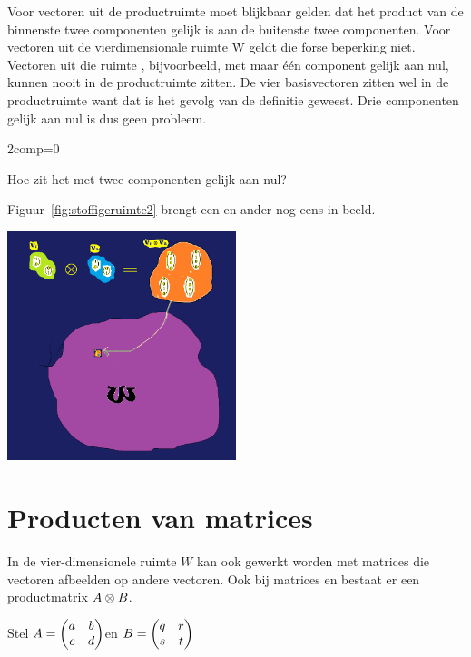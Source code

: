 \documentclass[../main.tex]{subfiles}
\begin{document}
\begin{mdframed}[style=wiskader,frametitle={Matrixen}]
Voor vectoren uit de productruimte moet blijkbaar gelden dat het product van de binnenste twee componenten gelijk is aan de buitenste twee componenten. Voor vectoren uit de vierdimensionale ruimte W geldt die forse beperking niet. Vectoren uit die ruimte , bijvoorbeeld, met maar \'e\'en component gelijk aan nul, kunnen nooit in de productruimte zitten. De vier basisvectoren zitten wel in de productruimte want dat is het gevolg van de definitie geweest. Drie componenten gelijk aan nul is dus geen probleem.

\begin{antwoord}
2comp=0
\end{antwoord}
\begin{opdracht}
Hoe zit het met twee componenten gelijk aan nul?
\end{opdracht}
 
Figuur~\ref{fig:stoffigeruimte2} brengt een en ander nog eens in beeld.
 
\begin{center}
\leavevmode
\includegraphics[width=0.5\textwidth]{./img/prodruimtev1v2.png}
\end{center}

\section{Producten van matrices}
In de vier-dimensionele ruimte $W$ kan ook gewerkt worden met matrices die vectoren afbeelden op andere vectoren. 
Ook bij matrices  en  bestaat er een productmatrix $A\otimes B$. 

Stel  $\matr{A} = \mqty(a & b \\ c&d)$en $\matr{B} = \mqty(q&r \\ s & t)$
 

\end{mdframed}
\end{document}
